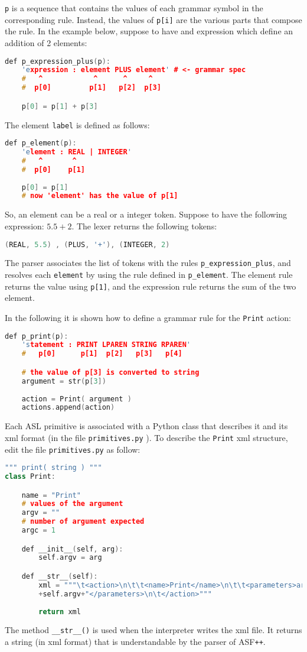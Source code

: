 \texttt{p} is a sequence that contains the values of each grammar symbol in the corresponding rule. Instead, the values of \texttt{p[i]} are the various parts that compose the rule. In the example below, suppose to have and expression which define an addition of 2 elements:
%
\begin{lstlisting}[language={cpp}]
def p_expression_plus(p):
	'expression : element PLUS element' # <- grammar spec
	#   ^            ^      ^     ^
	#  p[0]         p[1]   p[2]  p[3]

	p[0] = p[1] + p[3]
\end{lstlisting}

The element \texttt{label} is defined as follows:
%
\begin{lstlisting}[language={cpp}]
def p_element(p):
	'element : REAL | INTEGER' 
	#   ^       ^
	#  p[0]    p[1]
	
	p[0] = p[1]
	# now 'element' has the value of p[1]
\end{lstlisting}

So, an element can be a real or a integer token. Suppose to have the following expression: $5.5 + 2$. The lexer returns the following tokens: 
%
\begin{lstlisting}[language={cpp}]
(REAL, 5.5) , (PLUS, '+'), (INTEGER, 2)
\end{lstlisting}
%
The parser associates the list of tokens with the rules \texttt{p\_expression\_plus}, and resolves each \texttt{element} by using the rule defined in \texttt{p\_element}. The element rule returns the value using \texttt{p[1]}, and the expression rule returns the sum of the two element.

In the following it is shown how to define a grammar rule for the \texttt{Print} action:
%
\begin{lstlisting}[language={cpp}]
def p_print(p):
	'statement : PRINT LPAREN STRING RPAREN'
	#   p[0]      p[1]  p[2]   p[3]   p[4]

	# the value of p[3] is converted to string 
	argument = str(p[3])
	
	action = Print( argument )
	actions.append(action)
\end{lstlisting}
%
Each ASL primitive is associated with a Python class that describes it and its xml format (in the file \texttt{primitives.py} ). To describe the \texttt{Print} xml structure, edit the file \texttt{primitives.py} as follow:
%
\begin{lstlisting}[language={cpp}]
""" print( string ) """
class Print:

	name = "Print"
	# values of the argument
	argv = ""
	# number of argument expected
	argc = 1

	def __init__(self, arg):
		self.argv = arg

	def __str__(self):
		xml = """\t<action>\n\t\t<name>Print</name>\n\t\t<parameters>argument:"
		+self.argv+"</parameters>\n\t</action>"""
		
		return xml
\end{lstlisting}
%
The method \texttt{\_\_str\_\_()} is used when the interpreter writes the xml file. It returns a string (in xml format) that is understandable by the parser of ASF\texttt{++}.










